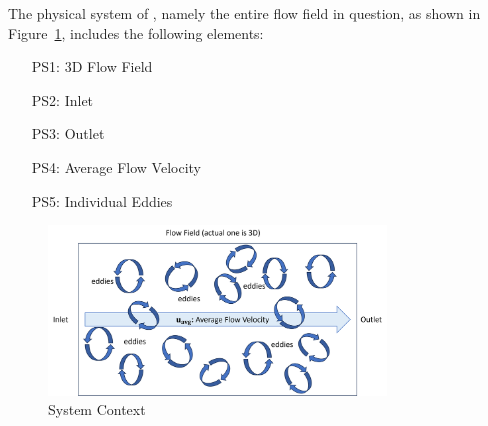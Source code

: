 \documentclass[12pt]{article}
\begin{document}

The physical system of \progname{}, namely the entire flow field in question, as shown in Figure~\ref{Fig_PhysicalSystem},
includes the following elements:

\begin{itemize}

\item[PS1:] 3D Flow Field
\item[PS2:] Inlet
\item[PS3:] Outlet
\item[PS4:] Average Flow Velocity
\item[PS5:] Individual Eddies

\end{itemize}

\begin{figure}[h!]
  \begin{center}
   \includegraphics[width=0.8\textwidth]{PS.png}
  \caption{System Context}
  \label{Fig_PhysicalSystem} 
  \end{center}
\end{figure}
\end{document}
